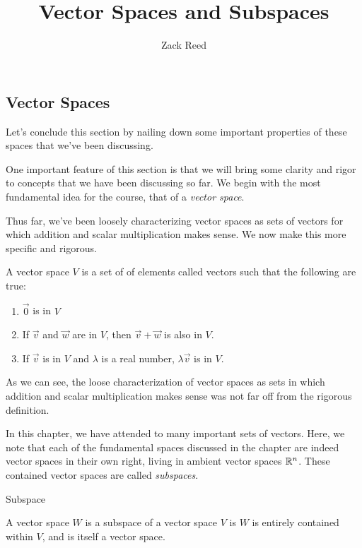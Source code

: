 \documentclass{ximera}
\author{Zack Reed}
\title{Vector Spaces and Subspaces}\license{CC BY-NC-SA 4.0}
\begin{document}
\begin{abstract}

\end{abstract}
\maketitle


\subsection*{Vector Spaces}

Let's conclude this section by nailing down some important properties of these spaces that we've been discussing.

One important feature of this section is that we will bring some clarity and rigor to concepts that we have been discussing so far. We begin with the most fundamental idea for the course, that of a \emph{vector space}.

Thus far, we've been loosely characterizing vector spaces as sets of vectors for which addition and scalar multiplication makes sense. We now make this more specific and rigorous.

\begin{definition}
  A vector space $V$ is a set of of elements called vectors such that the following are true:
  
  \begin{enumerate}
    \item $\vec{0}$ is in $V$
    \item If $\vec{v}$ and $\vec{w}$ are in $V$, then $\vec{v}+\vec{w}$ is also in $V$.
    \item If $\vec{v}$ is in $V$ and $\lambda$ is a real number, $\lambda\vec{v}$ is in $V$.
  \end{enumerate}

  As we can see, the loose characterization of vector spaces as sets in which addition and scalar multiplication makes sense was not far off from the rigorous definition.
\end{definition}

In this chapter, we have attended to many important sets of vectors. Here, we note that each of the fundamental spaces discussed in the chapter are indeed vector spaces in their own right, living in ambient vector spaces $\mathbb{R}^n$. These contained vector spaces are called \emph{subspaces}.



\begin{definition}{Subspace}

  
  A vector space $W$ is a subspace of a vector space $V$ is $W$ is entirely contained within $V$, and is itself a vector space. 


\end{definition}
\end{document}
